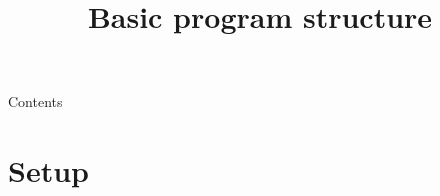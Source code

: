 
\usepackage{tikz}

\newcommand{\topic}{
    Basic program structure
}


\title{\topic}
\supertitle{\course}
\date{}



\maketitle

\begin{frame}{Contents}
	\tableofcontents
\end{frame}

\section{Setup}
